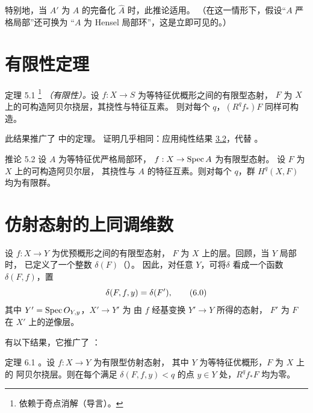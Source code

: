 特别地，当 $A'$ 为 $A$ 的完备化 $\hat{A}$ 时，此推论适用。
（在这一情形下，假设“$A$ 严格局部”还可换为
“$A$ 为 Hensel 局部环”，这是立即可见的。）

\section{有限性定理}\pageoriginale

\begin{enonce*}{定理 5.1}
\footnote[1]{\hypertarget{sga4.exp.XIX.note.resolution}{}依赖于奇点消解（\cf 导言）。}
\emph{（有限性）。}设 $f:X\rightarrow S$ 为等特征优概形之间的有限型态射，
$F$ 为 $X$ 上的可构造阿贝尔挠层，其挠性与特征互素。
则对每个 $q$，$(R^{q}f_{\ast})F$ 同样可构造。
\end{enonce*}

此结果推广了  中的定理。
证明几乎相同：应用纯性结果
\hyperref[XIX.thm3.2]{3.2}，代替 。

\begin{enonce*}{推论 5.2}
设 $A$ 为等特征优严格局部环，
$f:X\rightarrow \operatorname{Spec} A$ 为有限型态射。
设 $F$ 为 $X$ 上的可构造阿贝尔层，
其挠性与 $A$ 的特征互素。则对每个 $q$，群 $H^{q}(X,F)$ 均为有限群。
\end{enonce*}

\section{仿射态射的上同调维数}

设 $f:X\rightarrow Y$ 为优预概形之间的有限型态射，
$F$ 为 $X$ 上的层。回顾，当 $Y$ 局部时，
已定义了一个整数 $\delta(F)$（）。
因此，对任意 $Y$，可将\pageoriginale $\delta$ 看成一个函数 $\delta(F,f)$，置
\begin{equation*}
\delta(F,f,y)=\delta(F'){},\tag{6.0}
\end{equation*}
其中 $Y'=\operatorname{Spec} O_{Y,y}$，$X'\rightarrow Y'$ 为
由 $f$ 经基变换 $Y'\rightarrow Y$ 所得的态射，
$F'$ 为 $F$ 在 $X'$ 上的逆像层。

有以下结果，它推广了 ：

\begin{enonce*}{定理 6.1}
。设 $f:X\rightarrow Y$ 为有限型仿射态射，
其中 $Y$ 为等特征优概形，$F$ 为 $X$ 上的
阿贝尔挠层。则在每个满足 $\delta(F,f,y)<q$ 的点
$y\in Y$ 处，$R^{q}f_{\ast}F$ 均为零。
\end{enonce*}

